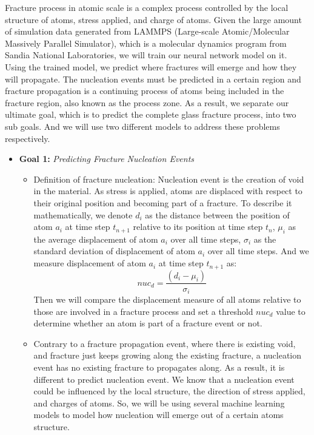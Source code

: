 
Fracture process in atomic scale is a complex process controlled by the local structure of atoms, stress applied, and charge of atoms. 
Given the large amount of simulation data generated from LAMMPS (Large-scale Atomic/Molecular Massively Parallel Simulator), which is a molecular dynamics program from Sandia National Laboratories, we will train our neural network model on it. Using the trained model, we predict where fractures will emerge and how they will propagate. The nucleation events must be predicted in a certain region and fracture propagation is a continuing process of atoms being included in the fracture region, also known as the process zone. As a result, we separate our ultimate goal, which is to predict the complete glass fracture process, into two sub goals. And we will use two different models to address these problems respectively. 


\begin{itemize}
\item \textbf{Goal 1:} \emph{Predicting Fracture Nucleation Events} 
\begin{itemize} 
    \item Definition of fracture nucleation: Nucleation event is the creation of void in the material. As stress is applied, atoms are displaced with respect to their original position and becoming part of a fracture. To describe it mathematically, we denote $d_i$ as the distance between the position of atom $a_i$ at time step $t_{n+1}$ relative to its position at time step $t_{n}$, $\mu_i$ as the average displacement of atom $a_i$ over all time steps, $\sigma_i$ as the standard deviation of displacement of atom $a_i$ over all time steps. And we measure displacement of atom $a_i$ at time step $t_{n+1}$ as:
    \[
    nuc_d = \frac{(d_i - \mu_i)}{\sigma_i}
    \]
    Then we will compare the displacement measure of all atoms relative to those are involved in a fracture process and set a threshold $nuc_d$ value to determine whether an atom is part of a fracture event or not.
    \item Contrary to a fracture propagation event, where there is existing void, and fracture just keeps growing along the existing fracture, a nucleation event has no existing fracture to propagates along. As a result, it is different to predict nucleation event. We know that a nucleation event could be influenced by the local structure, the direction of stress applied, and charges of atoms. So, we will be using several machine learning models to model how nucleation will emerge out of a certain atoms structure. 
\end{itemize}
\end{itemize}


